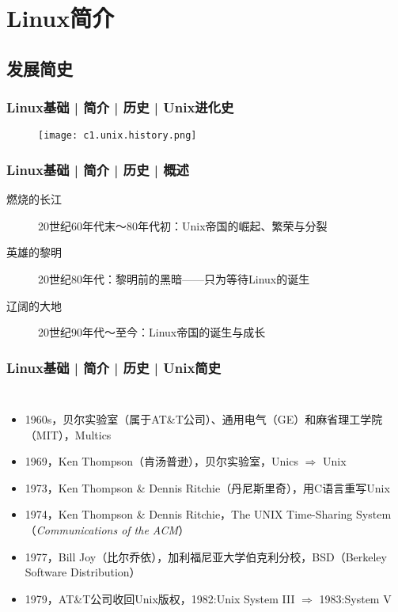 \section{Linux简介}
\subsection{发展简史}
\begin{frame}
  \frametitle{Linux基础 | 简介 | 历史 | Unix进化史}
  \begin{figure}
    \centering
    \texttt{[image: c1.unix.history.png]}
  \end{figure}
\end{frame}

\begin{frame}
  \frametitle{Linux基础 | 简介 | 历史 | 概述}
  \begin{description}
    \item[燃烧的长江] 20世纪60年代末～80年代初：Unix帝国的崛起、繁荣与分裂
    \item[英雄的黎明] 20世纪80年代：黎明前的黑暗——只为等待Linux的诞生
    \item[辽阔的大地] 20世纪90年代～至今：Linux帝国的诞生与成长
  \end{description}
  \begin{figure}
    \centering
  \end{figure}
\end{frame}

\begin{frame}
  \frametitle{Linux基础 | 简介 | 历史 | Unix简史}
  \begin{columns}
  \begin{itemize}[<+->]
    \item 1960s，贝尔实验室（属于AT\&T公司）、通用电气（GE）和麻省理工学院（MIT），Multics
    \item 1969，Ken Thompson（肯\textbullet 汤普逊），贝尔实验室，Unics $\Rightarrow$ Unix
    \item 1973，\alert{Ken Thompson \& Dennis Ritchie}（丹尼斯\textbullet 里奇），用C语言重写\alert{Unix}
    \item 1974，Ken Thompson \& Dennis Ritchie，The UNIX Time-Sharing System（\textit{Communications of the ACM}）
    \item 1977，Bill Joy（比尔\textbullet 乔依），加利福尼亚大学伯克利分校，BSD（Berkeley Software Distribution）
    \item 1979，AT\&T公司收回Unix版权，1982:Unix System III $\Rightarrow$ 1983:System V
  \end{itemize}
    \vspace{0.2cm}
  \end{columns}
\end{frame}


